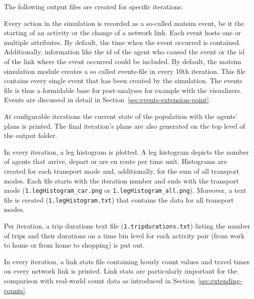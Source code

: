 The following output files are created for specific iterations:
\begin{description}\styleDescription

\item[Events:] Every action in the simulation is recorded as a so-called \gls{matsim} \gls{event}, be it the starting of an activity or the change of a network link. Each \gls{event} hosts one or multiple attributes. By default, the time when the \gls{event} occurred is contained. Additionally, information like the id of the agent who caused the event or the id of the link where the \gls{event} occurred could be included. By default, the \gls{matsim} simulation module creates a so called events-file in every 10th iteration. This file contains every single \gls{event} that has been created by the simulation. The events file is thus a formidable base for post-analyses for example with the visualizers. Events are discussed in detail in Section~\ref{sec:events-extension-point}.

\item[Plans:] At configurable iterations the current state of the population with the agents' plans is printed.
%
The final iteration's plans 
are also generated on the top level of the output folder.

\item[Leg Histogram:]
In every iteration, a leg histogram is plotted. A leg histogram depicts the number of agents that arrive, depart or are en route per time unit. Histograms are created for each transport mode and, additionally, for the sum of all transport modes. Each file starts with the iteration number and ends with the transport mode (\eg \lstinline|1.legHistogram_car.png| or \lstinline|1.legHistogram_all.png|). Moreover, a text file is created (\eg \lstinline|1.legHistogram.txt|) that contains the data for all transport modes.

\item[Trip Durations:]
Per iteration, a \gls{trip} durations text file (\eg \lstinline|1.tripdurations.txt|) listing the number of trips and their durations on a time bin level for each activity pair (\eg from work to home or from home to shopping) is put out.

\item[Link Stats:] In every iteration, a link stats file containing hourly count values and travel times on every network link is printed. Link stats are particularly important for the comparison with real-world count data as introduced in Section~\ref{sec:extending-counts}.

%
\end{description}

